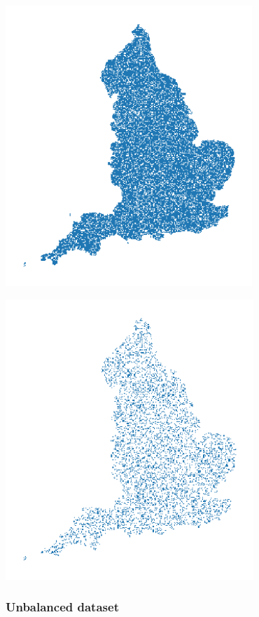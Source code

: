 \documentclass[
  letterpaper,
  DIV=11,
  numbers=noendperiod]{scrartcl}
\begin{document}
\begin{center}
\includegraphics[width=\textwidth,height=4.16667in]{../figures/algo_design/train_df.png}
\end{center}
\begin{center}
\includegraphics[width=\textwidth,height=4.16667in]{../figures/algo_design/test_df.png}
\end{center}

\subsubsection{Unbalanced dataset}\label{unbalanced-dataset}
\end{document}
